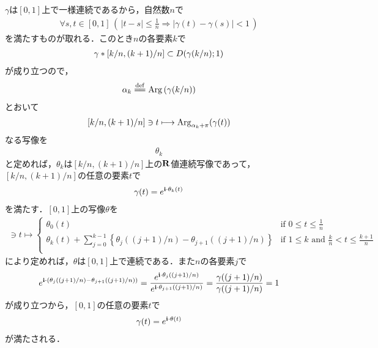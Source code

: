 	\begin{sketch}
		$\gamma$は$[0,1]$上で一様連続であるから，自然数$n$で
		\begin{align}
			\forall s,t \in [0,1]\, \left(\, |t-s| \leq \frac{1}{n} \Longrightarrow |\gamma(t) - \gamma(s)| < 1\, \right)
		\end{align}
		を満たすものが取れる．このとき$n$の各要素$k$で
		\begin{align}
			\gamma \ast \left[k/n,(k+1)/n\right] \subset D(\gamma(k/n);1)
		\end{align}
		が成り立つので，
		\begin{align}
			\alpha_{k} \defeq \pvarg{(\gamma(k/n))}
		\end{align}
		とおいて
		\begin{align}
			\left[k/n,(k+1)/n\right] \ni t \longmapsto \operatorname{Arg}_{\alpha_{k} + \pi}(\gamma(t))
		\end{align}
		なる写像を
		\begin{align}
			\theta_{k}
		\end{align}
		と定めれば，$\theta_{k}$は$\left[k/n,(k+1)/n\right]$上の$\mathbf{R}$値連続写像であって，
		$\left[k/n,(k+1)/n\right]$の任意の要素$t$で
		\begin{align}
			\gamma(t) = e^{\mathbf{i} \cdot \theta_{k}(t)}
		\end{align}
		を満たす．$[0,1]$上の写像$\theta$を
		\begin{align}
			[0,1] \ni t \longmapsto
			\begin{cases}
				\theta_{0}(t) & \mbox{if } {\displaystyle 0 \leq t \leq \frac{1}{n}} \\
				{\displaystyle \theta_{k}(t) + \sum_{j=0}^{k-1} \left\{\theta_{j}((j+1)/n) - \theta_{j+1}((j+1)/n)\right\}}
				& \mbox{if } 1 \leq k \mbox{ and } {\displaystyle \frac{k}{n} < t \leq \frac{k+1}{n}} \\
			\end{cases}
		\end{align}
		により定めれば，$\theta$は$[0,1]$上で連続である．また$n$の各要素$j$で
		\begin{align}
			e^{\mathbf{i} \cdot \left(\theta_{j}((j+1)/n) - \theta_{j+1}((j+1)/n)\right)}
			= \frac{e^{\mathbf{i} \cdot \theta_{j}((j+1)/n)}}{e^{\mathbf{i} \cdot \theta_{j+1}((j+1)/n)}}
			= \frac{\gamma((j+1)/n)}{\gamma((j+1)/n)}
			= 1
		\end{align}
		が成り立つから，$[0,1]$の任意の要素$t$で
		\begin{align}
			\gamma(t) = e^{\mathbf{i} \cdot \theta(t)}
		\end{align}
		が満たされる．
		\QED
	\end{sketch}
	
